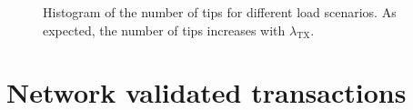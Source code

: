 \begin{figure}[!htb]
\centering
{}


\caption{Histogram of the number of tips for different load scenarios. As expected, the number of tips increases with $\lambda_\text{TX}$. \label{fig:hathor-tips}}
\end{figure}


\section{Network validated transactions}

